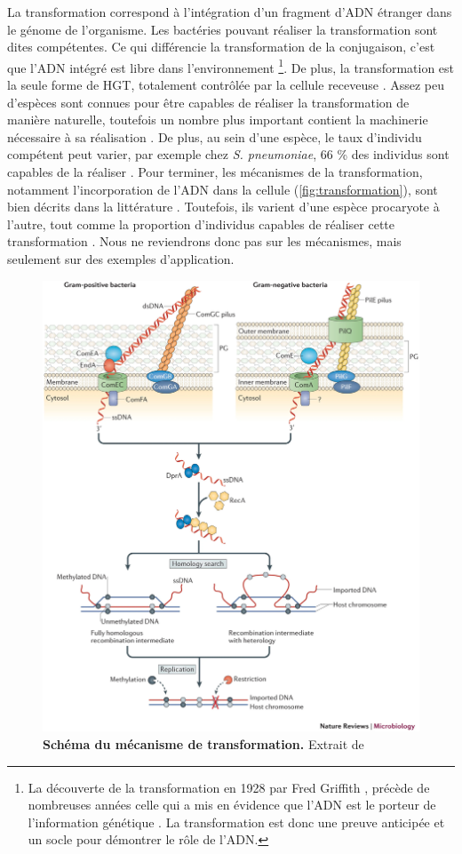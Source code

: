 La transformation correspond à l'intégration d'un fragment d'ADN étranger dans le génome de l'organisme. Les bactéries pouvant réaliser la transformation sont dites compétentes. Ce qui  différencie la transformation de la conjugaison, c'est que l'ADN intégré est libre dans l'environnement
\footnote{La découverte de la transformation en 1928 par Fred Griffith \cite{griffith_significance_1928}, précède de nombreuses années celle qui a mis en évidence que l'ADN est le porteur de l'information génétique \cite{avery_studies_1944}. La transformation est donc une preuve anticipée et un socle pour démontrer le rôle de l'ADN.}. De plus, la transformation est la seule forme de HGT, totalement contrôlée par la cellule receveuse \cite{huang_activation_2021}. Assez peu d'espèces sont connues pour être capables de réaliser la transformation de manière naturelle, toutefois un nombre plus important contient  la machinerie nécessaire à sa réalisation \cite{johnston_bacterial_2014}. De plus, au sein d'une espèce, le taux d'individu compétent peut varier, par exemple chez \textit{S. pneumoniae}, 66 \% des individus sont capables de la réaliser \cite{evans_significant_2013}.
Pour terminer, les mécanismes de la transformation, notamment l’incorporation de l’ADN dans la cellule (\autoref{fig:transformation}), sont bien décrits dans la littérature \cite{johnston_bacterial_2014,dubnau_mechanisms_2019}. Toutefois, ils varient d’une espèce procaryote à l’autre, tout comme la proportion d’individus capables de réaliser cette transformation \cite{stewart_biology_1986}. Nous ne reviendrons donc pas sur les mécanismes, mais seulement sur des exemples d'application.

\begin{figure}[htbp]
    \centering
    \includegraphics[width=0.625\linewidth]{images/transformation.png}
    \caption[Schéma du mécanisme de transformation]{\textbf{Schéma du mécanisme de transformation.} Extrait de \cite{johnston_bacterial_2014}}
    \label{fig:transformation}
\end{figure}

